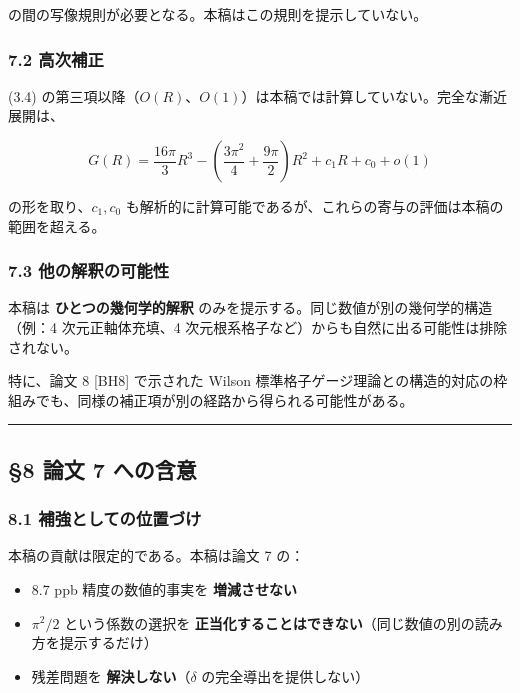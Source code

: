 \documentclass[
]{article}
\providecommand{\tightlist}{%
  \setlength{\itemsep}{0pt}\setlength{\parskip}{0pt}}
\begin{document}
の間の写像規則が必要となる。本稿はこの規則を提示していない。

\subsubsection{7.2 高次補正}\label{ux9ad8ux6b21ux88dcux6b63}

(3.4)
の第三項以降（\(O(R)\)、\(O(1)\)）は本稿では計算していない。完全な漸近展開は、

\[G(R) = \frac{16\pi}{3}R^3 - \left(\frac{3\pi^2}{4} + \frac{9\pi}{2}\right)R^2 + c_1 R + c_0 + o(1)\]

の形を取り、\(c_1, c_0\)
も解析的に計算可能であるが、これらの寄与の評価は本稿の範囲を超える。

\subsubsection{7.3
他の解釈の可能性}\label{ux4ed6ux306eux89e3ux91c8ux306eux53efux80fdux6027}

本稿は \textbf{ひとつの幾何学的解釈}
のみを提示する。同じ数値が別の幾何学的構造（例：4 次元正軸体充填、4
次元根系格子など）からも自然に出る可能性は排除されない。

特に、論文 8 {[}BH8{]} で示された Wilson
標準格子ゲージ理論との構造的対応の枠組みでも、同様の補正項が別の経路から得られる可能性がある。

\begin{center}\rule{0.5\linewidth}{0.5pt}\end{center}

\subsection{§8 論文 7
への含意}\label{ux8ad6ux6587-7-ux3078ux306eux542bux610f}

\subsubsection{8.1
補強としての位置づけ}\label{ux88dcux5f37ux3068ux3057ux3066ux306eux4f4dux7f6eux3065ux3051}

本稿の貢献は限定的である。本稿は論文 7 の：

\begin{itemize}
\tightlist
\item
  8.7 ppb 精度の数値的事実を \textbf{増減させない}
\item
  \(\pi^2/2\) という係数の選択を
  \textbf{正当化することはできない}（同じ数値の別の読み方を提示するだけ）
\item
  残差問題を \textbf{解決しない}（\(\delta\) の完全導出を提供しない）
\end{itemize}
\end{document}
